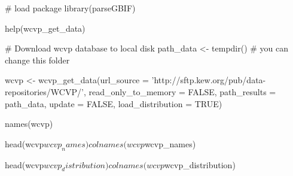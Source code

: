 \documentclass[a4paper]{book}
\begin{document}
\begin{Examples}
\begin{ExampleCode}

# load package
library(parseGBIF)

help(wcvp_get_data)

# Download wcvp database to local disk
path_data <- tempdir() # you can change this folder

wcvp <- wcvp_get_data(url_source = 'http://sftp.kew.org/pub/data-repositories/WCVP/',
                 read_only_to_memory = FALSE,
                 path_results = path_data,
                 update = FALSE,
                 load_distribution = TRUE)

names(wcvp)

head(wcvp$wcvp_names)
colnames(wcvp$wcvp_names)

head(wcvp$wcvp_distribution)
colnames(wcvp$wcvp_distribution)


\end{ExampleCode}
\end{Examples}
\printindex{}
\end{document}
